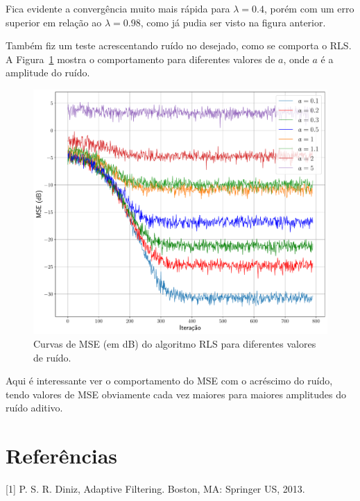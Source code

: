 \documentclass{homeworkclass}
\begin{document}
\begin{homeworkProblem}
	Fica evidente a convergência muito mais rápida para $\lambda = 0.4$, porém com um erro superior em relação ao $\lambda = 0.98$, como já pudia ser visto na figura anterior.
	\pagebreak
	
	Também fiz um teste acrescentando ruído no desejado, como se comporta o RLS. A Figura~\ref{fig:ruido} mostra o comportamento para diferentes valores de $a$, onde $a$ é a amplitude do ruído.
	
	\begin{figure}[!ht]
		\centering
		\includegraphics[width=\linewidth]{figs/ruidos}
		\caption{Curvas de MSE (em dB) do algoritmo RLS para diferentes valores de ruído.}
		\label{fig:ruido}
	\end{figure}
	
	Aqui é interessante ver o comportamento do MSE com o acréscimo do ruído, tendo valores de MSE obviamente cada vez maiores para maiores amplitudes do ruído aditivo.
	
\end{homeworkProblem}

\section*{Referências}
[1] P. S. R. Diniz, Adaptive Filtering. Boston, MA: Springer US, 2013.
\end{document}
